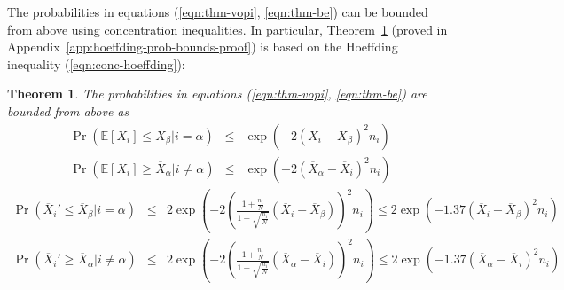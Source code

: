 \documentclass{article}
\newcommand {\IE} {\ensuremath {\mathbb{E}}}
\newtheorem{thm}{Theorem}
\begin{document}
The probabilities in equations (\ref{eqn:thm-vopi}, \ref{eqn:thm-be})
can be bounded from above using concentration inequalities. In
particular, Theorem~\ref{thm:hoeffding-prob-bounds} (proved in 
Appendix~\ref{app:hoeffding-prob-bounds-proof}) is based on the
Hoeffding inequality (\ref{eqn:conc-hoeffding}):
\begin{thm} The probabilities in equations (\ref{eqn:thm-vopi},
\ref{eqn:thm-be}) are bounded from above as
\begin{eqnarray}
\Pr(\IE[X_i] \le \overline X_\beta|i=\alpha)&
   \le & \exp(-2 (\overline X_i - \overline X_\beta)^2 n_i)\nonumber\\
\Pr(\IE[X_i] \ge \overline X_\alpha|i\ne\alpha)&
   \le & \exp(-2 (\overline X_\alpha - \overline X_i)^2 n_i)
\label{eqn:probound-perf-hoeffding}
\end{eqnarray}
\vspace{-1.5\baselineskip}
\begin{eqnarray}
\Pr(\overline X_i' \le \overline X_\beta|i=\alpha) &
   \le & 2\exp\left(- 2\left(\frac {1+\frac {n_i} N} {1+\sqrt {\frac {n_i} N}}(\overline X_i - \overline X_\beta)\right)^2 n_i \right)
   \le 2\exp\left(- 1.37(\overline X_i - \overline X_\beta)^2 n_i \right) \nonumber\\
\Pr(\overline X_i' \ge \overline X_\alpha|i\ne\alpha) &
   \le & 2\exp\left(- 2\left(\frac {1+\frac {n_i} N} {1+\sqrt {\frac {n_i} N}} (\overline X_\alpha - \overline X_i)\right)^2 n_i \right)
    \le 2\exp\left(- 1.37(\overline X_\alpha - \overline X_i)^2 n_i \right)
\label{eqn:probound-blnk-hoeffding}
\end{eqnarray}
\label{thm:hoeffding-prob-bounds}
\end{thm}
\end{document}

